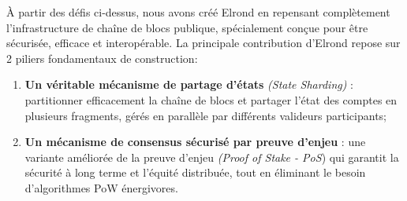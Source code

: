 \documentclass[journal]{IEEEtran}
\begin{document}
À partir des défis ci-dessus, nous avons créé Elrond en repensant complètement l'infrastructure de chaîne  de blocs  publique, spécialement conçue pour être sécurisée, efficace et interopérable. La principale contribution d'Elrond repose sur 2 piliers fondamentaux de construction: 

\begin{enumerate}
   \item \textbf{Un véritable mécanisme de partage d'états} \textit{(State Sharding)} : partitionner efficacement la chaîne de blocs et partager l'état des comptes en plusieurs fragments, gérés en parallèle par différents valideurs participants;
   \item \textbf{Un mécanisme de consensus sécurisé par preuve d'enjeu} : une variante améliorée de la preuve d'enjeu \textit{(Proof of Stake - PoS}) qui garantit la sécurité à long terme et l'équité distribuée, tout en éliminant le besoin d'algorithmes PoW énergivores.
\end{enumerate}
\end{document}
